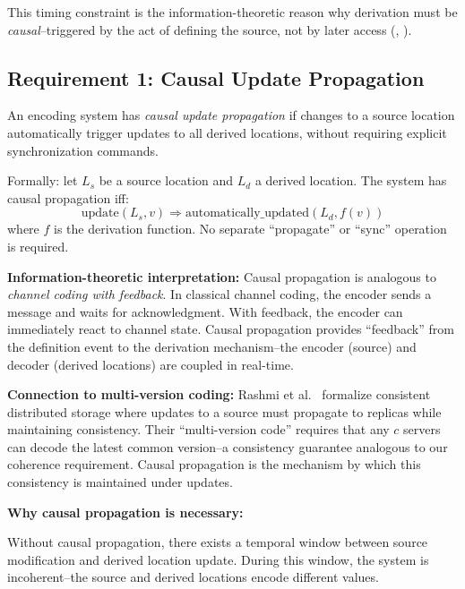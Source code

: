 This timing constraint is the information-theoretic reason why derivation must be \emph{causal}--triggered by the act of defining the source, not by later access (, ).

\subsection{Requirement 1: Causal Update Propagation}\label{sec:causal-propagation}

\begin{definition}\label{def:causal-propagation}
An encoding system has \emph{causal update propagation} if changes to a source location automatically trigger updates to all derived locations, without requiring explicit synchronization commands.

Formally: let $L_s$ be a source location and $L_d$ a derived location. The system has causal propagation iff:
\[
\text{update}(L_s, v) \Rightarrow \text{automatically\_updated}(L_d, f(v))
\]
where $f$ is the derivation function. No separate ``propagate'' or ``sync'' operation is required.
\end{definition}

\textbf{Information-theoretic interpretation:} Causal propagation is analogous to \emph{channel coding with feedback}. In classical channel coding, the encoder sends a message and waits for acknowledgment. With feedback, the encoder can immediately react to channel state. Causal propagation provides ``feedback'' from the definition event to the derivation mechanism--the encoder (source) and decoder (derived locations) are coupled in real-time.

\textbf{Connection to multi-version coding:} Rashmi et al.~\cite{rashmi2015multiversion} formalize consistent distributed storage where updates to a source must propagate to replicas while maintaining consistency. Their ``multi-version code'' requires that any $c$ servers can decode the latest common version--a consistency guarantee analogous to our coherence requirement. Causal propagation is the mechanism by which this consistency is maintained under updates.

\textbf{Why causal propagation is necessary:}

Without causal propagation, there exists a temporal window between source modification and derived location update. During this window, the system is incoherent--the source and derived locations encode different values.

